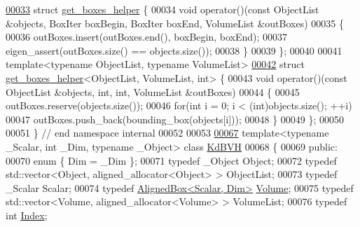 \begin{DoxyCode}
\hyperlink{struct_eigen_1_1internal_1_1get__boxes__helper}{00033} \textcolor{keyword}{struct }\hyperlink{struct_eigen_1_1internal_1_1get__boxes__helper}{get\_boxes\_helper} \{
00034   \textcolor{keywordtype}{void} operator()(\textcolor{keyword}{const} ObjectList &objects, BoxIter boxBegin, BoxIter boxEnd, VolumeList &outBoxes)
00035   \{
00036     outBoxes.insert(outBoxes.end(), boxBegin, boxEnd);
00037     eigen\_assert(outBoxes.size() == objects.size());
00038   \}
00039 \};
00040 
00041 \textcolor{keyword}{template}<\textcolor{keyword}{typename} ObjectList, \textcolor{keyword}{typename} VolumeList>
\hyperlink{struct_eigen_1_1internal_1_1get__boxes__helper_3_01_object_list_00_01_volume_list_00_01int_01_4}{00042} \textcolor{keyword}{struct }\hyperlink{struct_eigen_1_1internal_1_1get__boxes__helper}{get\_boxes\_helper}<ObjectList, VolumeList, int> \{
00043   \textcolor{keywordtype}{void} operator()(\textcolor{keyword}{const} ObjectList &objects, \textcolor{keywordtype}{int}, \textcolor{keywordtype}{int}, VolumeList &outBoxes)
00044   \{
00045     outBoxes.reserve(objects.size());
00046     \textcolor{keywordflow}{for}(\textcolor{keywordtype}{int} i = 0; i < (int)objects.size(); ++i)
00047       outBoxes.push\_back(bounding\_box(objects[i]));
00048   \}
00049 \};
00050 
00051 \} \textcolor{comment}{// end namespace internal}
00052 
00053 
\hyperlink{class_eigen_1_1_kd_b_v_h}{00067} \textcolor{keyword}{template}<\textcolor{keyword}{typename} \_Scalar, \textcolor{keywordtype}{int} \_Dim, \textcolor{keyword}{typename} \_Object> \textcolor{keyword}{class }\hyperlink{class_eigen_1_1_kd_b_v_h}{KdBVH}
00068 \{
00069 \textcolor{keyword}{public}:
00070   \textcolor{keyword}{enum} \{ Dim = \_Dim \};
00071   \textcolor{keyword}{typedef} \_Object Object;
00072   \textcolor{keyword}{typedef} std::vector<Object, aligned\_allocator<Object> > ObjectList;
00073   \textcolor{keyword}{typedef} \_Scalar Scalar;
00074   \textcolor{keyword}{typedef} \hyperlink{group___geometry___module_class_eigen_1_1_aligned_box}{AlignedBox<Scalar, Dim>} \hyperlink{group___geometry___module_class_eigen_1_1_aligned_box}{Volume};
00075   \textcolor{keyword}{typedef} std::vector<Volume, aligned\_allocator<Volume> > VolumeList;
00076   \textcolor{keyword}{typedef} \textcolor{keywordtype}{int} \hyperlink{namespace_eigen_a62e77e0933482dafde8fe197d9a2cfde}{Index};

\end{DoxyCode}
